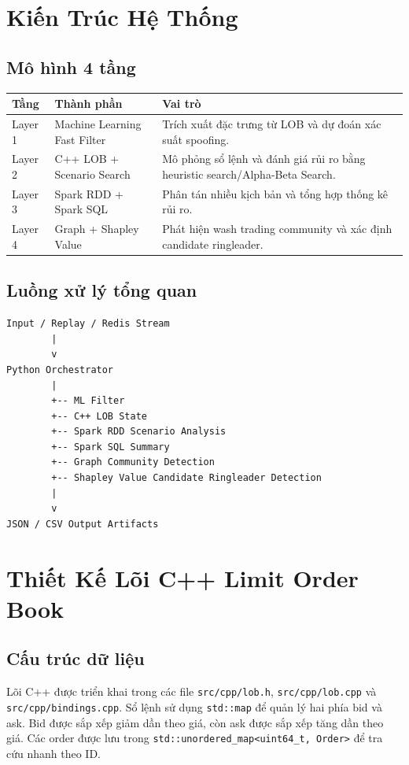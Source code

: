 \documentclass[12pt,a4paper]{report}
\begin{document}
\chapter{Kiến Trúc Hệ Thống}

\section{Mô hình 4 tầng}

\begin{longtable}{p{3cm}p{5cm}p{6cm}}
\toprule
\textbf{Tầng} & \textbf{Thành phần} & \textbf{Vai trò} \\
\midrule
Layer 1 & Machine Learning Fast Filter & Trích xuất đặc trưng từ LOB và dự đoán xác suất spoofing. \\
Layer 2 & C++ LOB + Scenario Search & Mô phỏng sổ lệnh và đánh giá rủi ro bằng heuristic search/Alpha-Beta Search. \\
Layer 3 & Spark RDD + Spark SQL & Phân tán nhiều kịch bản và tổng hợp thống kê rủi ro. \\
Layer 4 & Graph + Shapley Value & Phát hiện wash trading community và xác định candidate ringleader. \\
\bottomrule
\end{longtable}

\section{Luồng xử lý tổng quan}

\begin{lstlisting}
Input / Replay / Redis Stream
        |
        v
Python Orchestrator
        |
        +-- ML Filter
        +-- C++ LOB State
        +-- Spark RDD Scenario Analysis
        +-- Spark SQL Summary
        +-- Graph Community Detection
        +-- Shapley Value Candidate Ringleader Detection
        |
        v
JSON / CSV Output Artifacts
\end{lstlisting}

\chapter{Thiết Kế Lõi C++ Limit Order Book}

\section{Cấu trúc dữ liệu}

Lõi C++ được triển khai trong các file \texttt{src/cpp/lob.h}, \texttt{src/cpp/lob.cpp} và \texttt{src/cpp/bindings.cpp}. Sổ lệnh sử dụng \texttt{std::map} để quản lý hai phía bid và ask. Bid được sắp xếp giảm dần theo giá, còn ask được sắp xếp tăng dần theo giá. Các order được lưu trong \texttt{std::unordered\_map<uint64\_t, Order>} để tra cứu nhanh theo ID.
\end{document}
